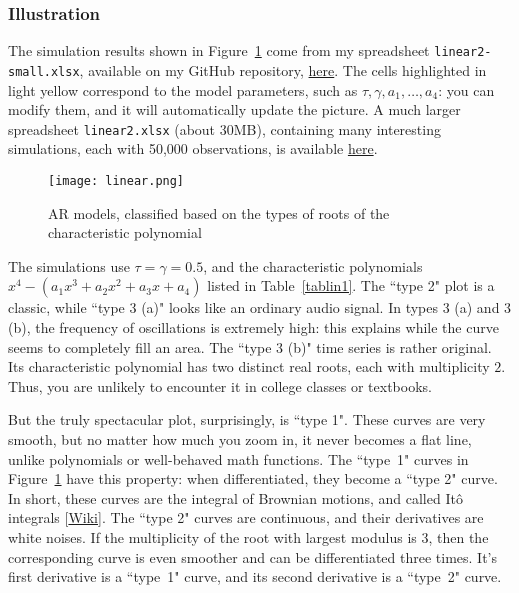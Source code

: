 \documentclass[oneside,10pt]{book}
\begin{document}
\subsubsection{Illustration}

The simulation results shown in Figure~\ref{fig:linearbv} come from my spreadsheet \texttt{linear2-small.xlsx}, available on my GitHub repository, 
\href{https://github.com/VincentGranville/Machine-Learning/blob/main/Spreadsheets/README.md}{here}. The cells highlighted in light yellow 
correspond to the model parameters, such as $\tau,\gamma, a_1,\dots,a_4$: you can modify them, and it will automatically update the picture.
A much larger spreadsheet \texttt{linear2.xlsx} (about 30MB), containing many interesting simulations, each with 50,000 observations,
 is available \href{https://ln5.sync.com/dl/4c157bf10/5be4uhcd-w6g99e8h-96ndb9t4-jshr672n}{here}.

\begin{figure}%
\centering
\texttt{[image: linear.png]}
\caption{AR models, classified based on the types of roots of the characteristic polynomial}
\label{fig:linearbv}
\end{figure}


The simulations use $\tau=\gamma=0.5$, and the characteristic polynomials $x^4-(a_1x^3+a_2 x^2 +a_3 x + a_4)$ listed 
in Table~\ref{tablin1}. The ``type 2" plot is a classic, while ``type 3 (a)" looks like an ordinary audio signal. 
In types 3 (a) and 3 (b), the frequency of oscillations is extremely high: this explains while the curve seems to completely fill an area. 
The ``type 3 (b)" time series is rather original. Its characteristic polynomial has two distinct real roots, each with multiplicity $2$. Thus, you are
unlikely to encounter it in college classes or textbooks. 

But the truly spectacular plot, surprisingly, is ``type 1". These curves are very smooth,
 but no matter how much you zoom in, it never becomes a flat line, unlike polynomials or well-behaved math functions. The ``type~1" curves  in
 Figure~\ref{fig:linearbv} have this property: when differentiated, they become a ``type 2" curve. In short, 
these curves are the integral of Brownian motions, and called \textcolor{index}{Itô integrals} [\href{https://www.robots.ox.ac.uk/~lsgs/posts/2018-09-30-ito-strat.html}{Wiki}]. The ``type 2" curves  are continuous, and their derivatives are white noises.
If the multiplicity of the root with largest modulus is $3$, then the corresponding curve is even smoother and can be differentiated three times. It's first derivative is a ``type~1" curve, and its second derivative is a ``type~2" curve. 
\end{document}
